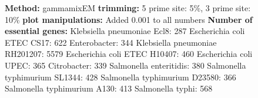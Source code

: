 \documentclass[a4paper,10pt]{article}
\begin{document}
\begin{figure}
{\textbf{Method:} gammamixEM \newline
\textbf{trimming:} 5 prime site: 5\%, 3 prime site: 10\%\newline
\textbf{plot manipulations:} Added 0.001 to all numbers \newline
\textbf{Number of essential genes:}\newline
Klebsiella pneumoniae Ecl8: 287\newline
Escherichia coli ETEC CS17: 622\newline
Enterobacter: 344\newline
Klebsiella pneumoniae RH201207: 5579\newline
Escherichia coli ETEC H10407: 460\newline
Escherichia coli UPEC: 365\newline
Citrobacter: 339\newline
Salmonella enteritidis: 380\newline
Salmonella typhimurium SL1344: 428\newline
Salmonella typhimurium D23580: 366\newline
Salmonella typhimurium A130: 413\newline
Salmonella typhi: 568}
\end{figure}
\end{document}
